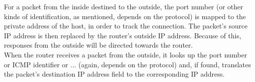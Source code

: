For a packet from the inside destined to the outside, the port number (or other kinds
of identification, as mentioned, depends on the protocol) is mapped to the private
address of the host, in order to track the connection. The packet's source IP address
is then replaced by the router's outside IP address. Because of this, responses from
the outside will be directed towards the router. \\
When the router receives a packet from the outside, it looks up the port number or
ICMP identifier or ... (again, depends on the protocol) and, if found, translates the
packet's destination IP address field to the corresponding IP address.
